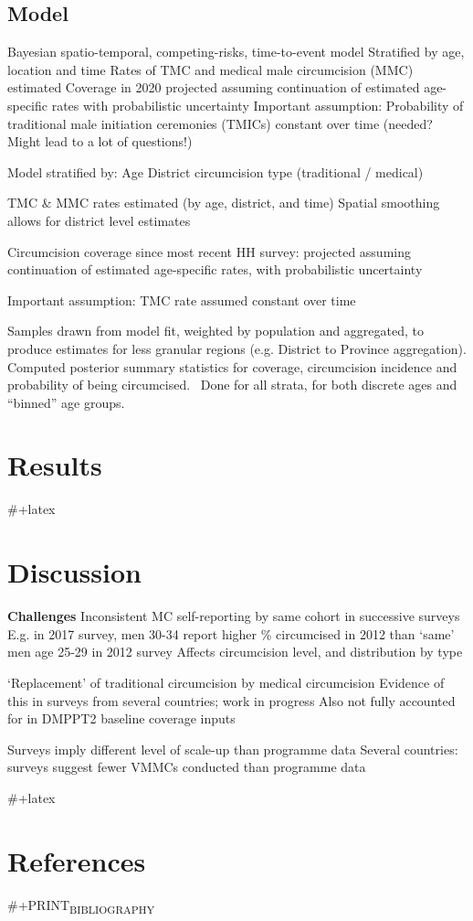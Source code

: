 \documentclass[a4paper, 12pt]{article}
\begin{document}
\subsection{Model}
\label{sec:orged2a105}

Bayesian spatio-temporal, competing-risks, time-to-event model
Stratified by age, location and time
Rates of TMC and medical male circumcision (MMC) estimated
Coverage in 2020 projected assuming continuation of estimated age-specific rates with probabilistic uncertainty
Important assumption: Probability of traditional male initiation ceremonies (TMICs) constant over time (needed? Might lead to a lot of questions!) 

Model stratified by:
Age
District
circumcision type (traditional / medical)

TMC \& MMC rates estimated (by age, district, and time)
Spatial smoothing allows for district level estimates

Circumcision coverage since most recent HH survey: projected assuming continuation of estimated age-specific rates, with probabilistic uncertainty

Important assumption: TMC rate assumed constant over time


\newpage

Samples drawn from model fit, weighted by population and aggregated, to produce estimates for less granular regions (e.g. District to Province aggregation).
Computed posterior summary statistics for coverage, circumcision incidence and probability of being circumcised. 
Done for all strata, for both discrete ages and “binned” age groups.



\section{Results}
\label{sec:org6d5db2a}

\#+latex \newpage

\section{Discussion}
\label{sec:org7ea7be6}

\textbf{Challenges}
Inconsistent MC self-reporting by same cohort in successive surveys
E.g. in 2017 survey, men 30-34 report higher \% circumcised in 2012 than ‘same’ men age 25-29 in 2012 survey
Affects circumcision level, and distribution by type

‘Replacement’ of traditional circumcision by medical circumcision
Evidence of this in surveys from several countries; work in progress
Also not fully accounted for in DMPPT2 baseline coverage inputs

Surveys imply different level of scale-up than programme data
Several countries: surveys suggest fewer VMMCs conducted than programme data

\#+latex \newpage

\section{References}
\label{sec:orgb82199f}

\#+PRINT\textsubscript{BIBLIOGRAPHY}
\end{document}
